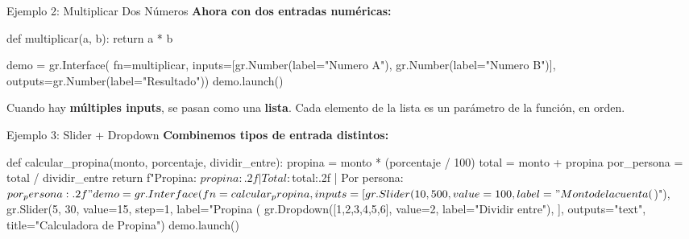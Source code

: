 \documentclass[aspectratio=169, 11pt]{beamer}
\begin{document}
\begin{frame}[fragile,shrink=10]{Ejemplo 2: Multiplicar Dos N\'umeros}
  \vspace{-4pt}
  {\footnotesize\color{arcaDark}\bfseries
    Ahora con dos entradas num\'ericas:}

  \vspace{4pt}
  \begin{pyblock}
def multiplicar(a, b):
    return a * b

demo = gr.Interface(
    fn=multiplicar,
    inputs=[gr.Number(label="Numero A"),
            gr.Number(label="Numero B")],
    outputs=gr.Number(label="Resultado"))
demo.launch()
  \end{pyblock}

  \vspace{4pt}
  {\scriptsize\color{arcaDark}
    \faArrowRight\hspace{4pt} Cuando hay \textbf{m\'ultiples inputs}, se pasan
    como una \textbf{lista}. Cada elemento de la lista es un par\'ametro
    de la funci\'on, en orden.}
\end{frame}

\begin{frame}[fragile,shrink=10]{Ejemplo 3: Slider + Dropdown}
  \vspace{-4pt}
  {\footnotesize\color{arcaDark}\bfseries
    Combinemos tipos de entrada distintos:}

  \vspace{4pt}
  \begin{pyblock}
def calcular_propina(monto, porcentaje, dividir_entre):
    propina = monto * (porcentaje / 100)
    total = monto + propina
    por_persona = total / dividir_entre
    return f"Propina: ${propina:.2f} | Total: ${total:.2f} | Por persona: ${por_persona:.2f}"

demo = gr.Interface(
    fn=calcular_propina,
    inputs=[
        gr.Slider(10, 500, value=100, label="Monto de la cuenta ($)"),
        gr.Slider(5, 30, value=15, step=1, label="Propina (%
        gr.Dropdown([1,2,3,4,5,6], value=2, label="Dividir entre"),
    ],
    outputs="text",
    title="Calculadora de Propina")
demo.launch()
  \end{pyblock}
\end{frame}
\end{document}
